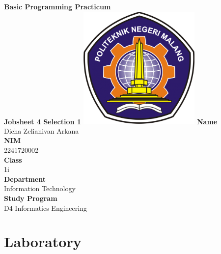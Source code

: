 \documentclass[12pt,titlepage]{article}
\newcommand{\vSubject}{Basic Programming Practicum}
\newcommand{\vSubtitle}{Jobsheet 4 Selection 1}
\newcommand{\vName}{Dicha Zelianivan Arkana}
\newcommand{\vNIM}{2241720002}
\newcommand{\vClass}{1i}
\newcommand{\vDepartment}{Information Technology}
\newcommand{\vStudyProgram}{D4 Informatics Engineering}
\begin{document}
\begin{titlepage}
    \centering
    \vfill
    {\bfseries\LARGE
        \vSubject\\
        \vskip0.25cm
        \vSubtitle
    }
    \vfill
    \includegraphics[width=6cm]{images/polinema-logo.png}
    \vfill
    {
        \textbf{Name}\\
        \vName\\
        \vskip0.5cm
        \textbf{NIM}\\
        \vNIM\\
        \vskip0.5cm
        \textbf{Class}\\
        \vClass\\
        \vskip0.5cm
        \textbf{Department}\\
        \vDepartment\\
        \vskip0.5cm
        \textbf{Study Program}\\
        \vStudyProgram
    }
\end{titlepage}

\tableofcontents
\pagebreak

\section{Laboratory}
\end{document}
